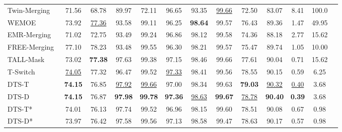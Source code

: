 \documentclass[11pt]{article}
\begin{document}
\begin{table}[htbp]
{\begin{tabular}{lcccccccccccc}
    \rowcolor{blue!10}
    Twin-Merging~             & 71.56 & 68.78 & 89.97 & 72.11 & 96.65 & 93.35 & \underline{99.66} & 72.50 & 83.07 & 8.41  & 100.0 \\ 
    \rowcolor{blue!10} 
    WEMOE~                    & 73.92 & \underline{77.36} & 93.58 & 99.11 & 96.25 & \textbf{98.64} & 99.57 & 76.43 & 89.36 & 1.47 & 49.95 \\
    \rowcolor{blue!10}
    EMR-Merging~             & 71.02 & 72.75 & 93.49 & 99.24 & 96.86 & 98.12 & 99.58 & 74.36 & 88.18 & 2.77  & 15.62 \\ 
     \rowcolor{blue!10}
    FREE-Merging~             & 77.10 & 78.23 & 93.48 & 99.55 & 96.30 & 98.21 & 99.57 & 75.47 & 89.74 & 1.05  & 10.00 \\ 
    \rowcolor{blue!10}
    TALL-Mask~ & 73.02 & \textbf{77.38} & 97.63 & 99.38 & 97.15 & 98.46 & 99.66 & 77.61 & 90.04 & 0.71  & 15.62 \\ 
    \rowcolor{blue!10}
    T-Switch~   & \underline{74.05} & 77.32 & 96.47 & 99.52 & \underline{97.33} & 98.41 & 99.56 & 78.55 & 90.15 
 & 0.59   & 6.25  \\
    \rowcolor{green!15}
    DTS-T &  \textbf{74.15} & 76.85 & \underline{97.92} & \underline{99.66 }& 97.00 & 98.34 & 99.63 & \textbf{79.03} & \underline{90.32} & \underline{0.40} & 3.68 \\
    \rowcolor{green!15}
    DTS-D & \textbf{74.15} & 76.87 & \textbf{97.98} & \textbf{99.78} & \textbf{97.36} & \underline{98.63} & \textbf{99.67} & \underline{78.78} & \textbf{90.40} & \textbf{0.39} & 3.68 \\
    \rowcolor{green!15}
    DTS-T*  & 74.01 & 76.13 & 97.74 & 99.52 & 96.96 & 98.15 & 99.60 & 78.51 & 90.08 
 & 0.67  & 0.98  \\
    \rowcolor{green!15}
    DTS-D* &  73.97 & 76.42 & 97.58 & 99.56 & 97.13 & 98.58 & 99.47 & 78.63 & 90.17 
  & 0.57 & 0.98 \\ 
    \bottomrule
  \end{tabular}
}
\end{table}
\end{document}
